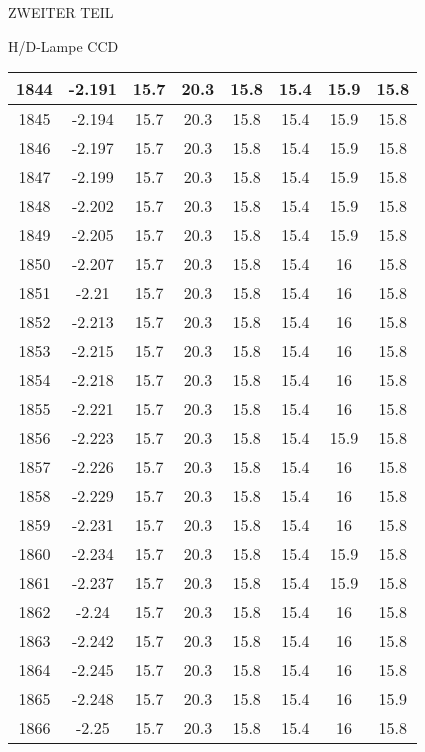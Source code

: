 \begin{appendix}
\begin{chapter}{ZWEITER TEIL}
\begin{section}{H/D-Lampe CCD}
\begin{scriptsize}
\begin{longtable}[htbp]{|c|c|c|c|c|c|c|c|}
            1844 & -2.191 & 15.7 & 20.3 & 15.8 & 15.4 & 15.9 & 15.8 \\ \hline
            1845 & -2.194 & 15.7 & 20.3 & 15.8 & 15.4 & 15.9 & 15.8 \\ \hline
            1846 & -2.197 & 15.7 & 20.3 & 15.8 & 15.4 & 15.9 & 15.8 \\ \hline
            1847 & -2.199 & 15.7 & 20.3 & 15.8 & 15.4 & 15.9 & 15.8 \\ \hline
            1848 & -2.202 & 15.7 & 20.3 & 15.8 & 15.4 & 15.9 & 15.8 \\ \hline
            1849 & -2.205 & 15.7 & 20.3 & 15.8 & 15.4 & 15.9 & 15.8 \\ \hline
            1850 & -2.207 & 15.7 & 20.3 & 15.8 & 15.4 & 16 & 15.8 \\ \hline
            1851 & -2.21 & 15.7 & 20.3 & 15.8 & 15.4 & 16 & 15.8 \\ \hline
            1852 & -2.213 & 15.7 & 20.3 & 15.8 & 15.4 & 16 & 15.8 \\ \hline
            1853 & -2.215 & 15.7 & 20.3 & 15.8 & 15.4 & 16 & 15.8 \\ \hline
            1854 & -2.218 & 15.7 & 20.3 & 15.8 & 15.4 & 16 & 15.8 \\ \hline
            1855 & -2.221 & 15.7 & 20.3 & 15.8 & 15.4 & 16 & 15.8 \\ \hline
            1856 & -2.223 & 15.7 & 20.3 & 15.8 & 15.4 & 15.9 & 15.8 \\ \hline
            1857 & -2.226 & 15.7 & 20.3 & 15.8 & 15.4 & 16 & 15.8 \\ \hline
            1858 & -2.229 & 15.7 & 20.3 & 15.8 & 15.4 & 16 & 15.8 \\ \hline
            1859 & -2.231 & 15.7 & 20.3 & 15.8 & 15.4 & 16 & 15.8 \\ \hline
            1860 & -2.234 & 15.7 & 20.3 & 15.8 & 15.4 & 15.9 & 15.8 \\ \hline
            1861 & -2.237 & 15.7 & 20.3 & 15.8 & 15.4 & 15.9 & 15.8 \\ \hline
            1862 & -2.24 & 15.7 & 20.3 & 15.8 & 15.4 & 16 & 15.8 \\ \hline
            1863 & -2.242 & 15.7 & 20.3 & 15.8 & 15.4 & 16 & 15.8 \\ \hline
            1864 & -2.245 & 15.7 & 20.3 & 15.8 & 15.4 & 16 & 15.8 \\ \hline
            1865 & -2.248 & 15.7 & 20.3 & 15.8 & 15.4 & 16 & 15.9 \\ \hline
            1866 & -2.25 & 15.7 & 20.3 & 15.8 & 15.4 & 16 & 15.8 \\ \hline

\end{longtable}
\end{scriptsize}
\end{section}
\end{chapter}
\end{appendix}
